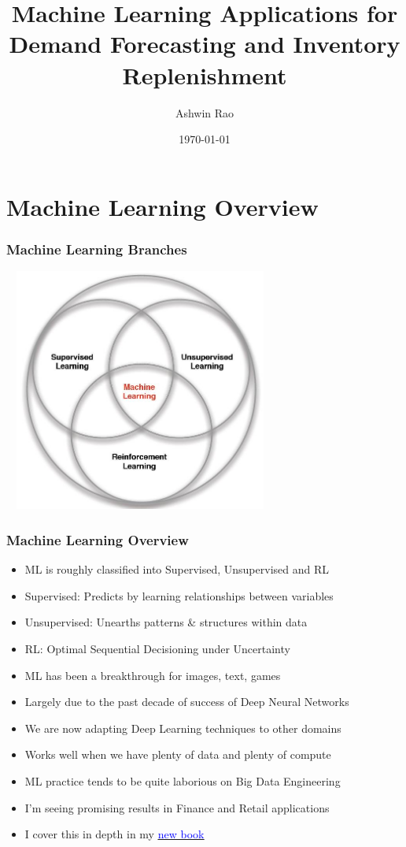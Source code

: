 \documentclass[handout]{beamer}
\title[ML for Forecasting and Replenishment]{Machine Learning Applications for \\ Demand Forecasting and Inventory Replenishment} %
\author{Ashwin Rao} %
\institute[Wayfair/Stanford] %
{
Chief Science Officer @ Wayfair and Adjunct Professor @ Stanford University
}
\date{\today} %
\begin{document}
\begin{frame}
\titlepage %
\end{frame}

\tableofcontents

\section{Machine Learning Overview}

\begin{frame}
\frametitle{Machine Learning Branches}
\includegraphics[width=9cm, height=8cm]{../finance/cme241/MLBranches.PNG}
\end{frame}

\begin{frame}
\frametitle{Machine Learning Overview}
\pause
\begin{itemize}[<+->]
\item ML is roughly classified into Supervised, Unsupervised and RL
\item Supervised: Predicts by learning relationships between variables
\item Unsupervised: Unearths patterns \& structures within data
\item RL: Optimal Sequential Decisioning under Uncertainty
\item ML has been a breakthrough for images, text, games
\item Largely due to the past decade of success of Deep Neural Networks
\item We are now adapting Deep Learning techniques to other domains
\item Works well when we have plenty of data and plenty of compute
\item ML practice tends to be quite laborious on Big Data Engineering
\item I'm seeing promising results in Finance and Retail applications
\item I cover this in depth in my \href{https://stanford.edu/~ashlearn/RLForFinanceBook/book.pdf}{\underline{\textcolor{blue}{new book}}}
\end{itemize}
\end{frame}
\end{document}
